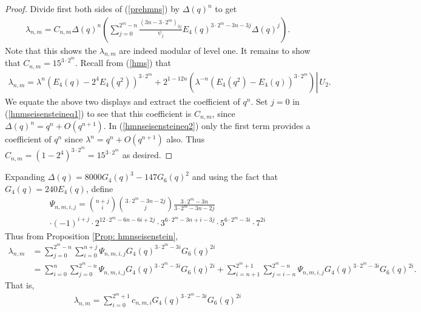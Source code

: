 \documentclass[10pt,a4paper]{amsart}
\numberwithin{equation}{section}
\theoremstyle{definition}
\newcommand{\haupt}{\lambda}
\begin{document}
\begin{proof}
    Divide first both sides of (\ref{prehmns}) by $\Delta (q)^{n}$ to get
    \begin{align}
        \haupt_{n,m} = C_{n,m}\Delta (q)^{n} \left( \sum_{j=0}^{2^{m}-n} \frac{(3n- 3 \cdot 2^{m})_{3j}}{\psi_{j}} E_{4}(q)^{3 \cdot 2^{m} - 3n - 3j} \Delta (q)^{j} \right). \label{hnmseisensteineq1}
    \end{align}
    Note that this shows the $\haupt_{n,m}$ are indeed modular of level one. It remains to show that $C_{n,m} = 15^{3 \cdot 2^{m}}$. Recall from (\ref{hms}) that
    \begin{align}
        \haupt_{n,m} = \haupt^{n}\left( E_{4}(q)- 2^{4} E_{4}(q^{2}) \right)^{3 \cdot 2^{m}} + 2^{1-12n} \left. \left( \haupt^{-n} \left( E_{4}(q^{2})-E_{4}(q) \right)^{3 \cdot 2^{m}} \right) \right\rvert \hspace{2pt} U_{2}. \label{hmnseisensteineq2}
    \end{align}
    We equate the above two displays and extract the coefficient of $q^{n}$. Set $j=0$ in (\ref{hnmseisensteineq1}) to see that this coefficient is $C_{n,m}$, since $\Delta (q)^{n} = q^{n} + O(q^{n+1})$. In (\ref{hmnseisensteineq2}) only the first term provides a coefficient of $q^{n}$ since $\haupt^{n} = q^{n} + O(q^{n+1})$ also. Thus $C_{n,m} = (1-2^{4})^{3 \cdot 2^{m}} = 15^{3 \cdot 2^{m}}$ as desired.
\end{proof}
Expanding $\Delta (q) = 8000G_{4}(q)^{3} - 147G_{6}(q)^{2}$ and using the fact that $G_{4}(q) = 240 E_{4}(q)$, define
\begin{multline}
    \Psi_{n,m,i,j} = \binom{n+j}{i} \binom{3 \cdot 2^{m}-3n-2j}{j} \frac{3 \cdot 2^{m}-3n}{3 \cdot 2^{m}-3n-2j} \\ \cdot (-1)^{i+j} \cdot 2^{12 \cdot 2^{m} - 6n-6i+2j} \cdot 3^{6 \cdot 2^{m}-3n+i-3j} \cdot 5^{6 \cdot 2^{m}-3i} \cdot 7^{2i}  \label{bigpsicoeff}
\end{multline}
Thus from Proposition \ref{Prop: hmnseisenstein},
\begin{align*}
    \haupt_{n,m} &= \sum_{j=0}^{2^{m}-n} \sum_{i=0}^{n+j} \Psi_{n,m,i,j} G_{4}(q)^{3\cdot 2^{m}-3i} G_{6}(q)^{2i} \\
    &= \sum_{i=0}^{n} \sum_{j=0}^{2^{m}-n} \Psi_{n,m,i,j} G_{4}(q)^{3\cdot 2^{m}-3i} G_{6}(q)^{2i} + \sum_{i=n+1}^{2^{m} +1} \sum_{j=i-n}^{2^{m}-n} \Psi_{n,m,i,j} G_{4}(q)^{3 \cdot 2^{m}-3i} G_{6}(q)^{2i}.
\end{align*}
That is,
\begin{align*}
    \haupt_{n,m} = \sum_{i=0}^{2^{m} +1} c_{n,m,i} G_{4}(q)^{3 \cdot 2^{m}-3i} G_{6}(q)^{2i}
\end{align*}
\end{document}
